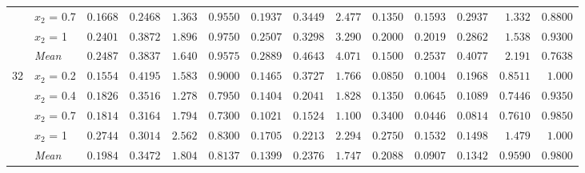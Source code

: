 \begin{table}[htbp]
\begin{tabular}{llrrrrrrrrrrrr}
 & $x_2$ = 0.7 & $0.1668$ & {\boldmath$0.2468$} & $1.363$ & $0.9550$ & $0.1937$ & $0.3449$ & $2.477$ & $0.1350$ & {\boldmath$0.1593$} & $0.2937$ & {\boldmath$1.332$} & {\boldmath$0.8800$} \\
 & $x_2$ = 1 & $0.2401$ & $0.3872$ & $1.896$ & $0.9750$ & $0.2507$ & $0.3298$ & $3.290$ & $0.2000$ & {\boldmath$0.2019$} & {\boldmath$0.2862$} & {\boldmath$1.538$} & {\boldmath$0.9300$} \\
 & \textit{Mean} & \colorbox{green!20}{\boldmath$0.2487$} & \colorbox{green!20}{\boldmath$0.3837$} & \colorbox{green!20}{\boldmath$1.640$} & \colorbox{green!20}{\boldmath$0.9575$} & $0.2889$ & $0.4643$ & $4.071$ & $0.1500$ & $0.2537$ & $0.4077$ & $2.191$ & $0.7638$ \\
\midrule
\multirow{5}{*}{32} & $x_2$ = 0.2 & $0.1554$ & $0.4195$ & $1.583$ & {\boldmath$0.9000$} & $0.1465$ & $0.3727$ & $1.766$ & $0.0850$ & {\boldmath$0.1004$} & {\boldmath$0.1968$} & {\boldmath$0.8511$} & $1.000$ \\
 & $x_2$ = 0.4 & $0.1826$ & $0.3516$ & $1.278$ & $0.7950$ & $0.1404$ & $0.2041$ & $1.828$ & $0.1350$ & {\boldmath$0.0645$} & {\boldmath$0.1089$} & {\boldmath$0.7446$} & {\boldmath$0.9350$} \\
 & $x_2$ = 0.7 & $0.1814$ & $0.3164$ & $1.794$ & $0.7300$ & $0.1021$ & $0.1524$ & $1.100$ & $0.3400$ & {\boldmath$0.0446$} & {\boldmath$0.0814$} & {\boldmath$0.7610$} & {\boldmath$0.9850$} \\
 & $x_2$ = 1 & $0.2744$ & $0.3014$ & $2.562$ & {\boldmath$0.8300$} & $0.1705$ & $0.2213$ & $2.294$ & $0.2750$ & {\boldmath$0.1532$} & {\boldmath$0.1498$} & {\boldmath$1.479$} & $1.000$ \\
 & \textit{Mean} & $0.1984$ & $0.3472$ & $1.804$ & $0.8137$ & $0.1399$ & $0.2376$ & $1.747$ & $0.2088$ & \colorbox{green!20}{\boldmath$0.0907$} & \colorbox{green!20}{\boldmath$0.1342$} & \colorbox{green!20}{\boldmath$0.9590$} & \colorbox{green!20}{\boldmath$0.9800$} \\
\bottomrule
\end{tabular}
\end{table}
